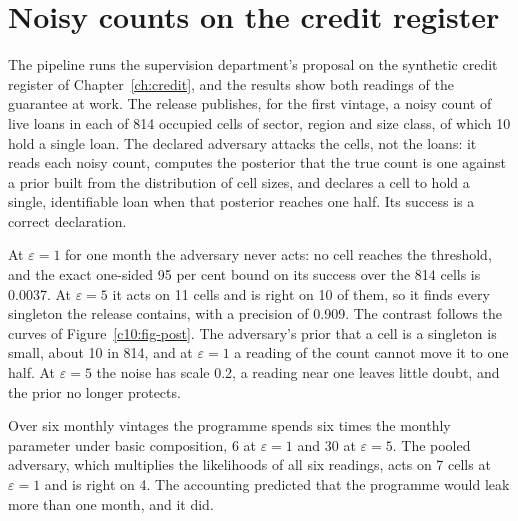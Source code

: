 \section{Noisy counts on the credit register}\label{c10:sec-counts}

The pipeline runs the supervision department's proposal on the synthetic credit
register of Chapter~\ref{ch:credit}, and the results show both readings of the
guarantee at work. The release publishes, for the first vintage, a noisy count of
live loans in each of 814 occupied cells of sector, region and size class, of which
10 hold a single loan.
The declared adversary attacks the cells, not the loans: it reads each noisy
count, computes the posterior that the true count is one against a prior built
from the distribution of cell sizes, and declares a cell to hold a single,
identifiable loan when that posterior reaches one half. Its success is a correct
declaration.

At $\varepsilon = 1$ for one month the adversary never acts: no cell reaches the
threshold, and the exact one-sided 95 per cent bound on its success over the 814
cells is 0.0037. At $\varepsilon = 5$ it acts on 11 cells and is right on 10 of
them, so it finds every singleton the release contains, with a precision of 0.909.
The contrast follows the curves of Figure~\ref{c10:fig-post}. The adversary's
prior that a cell is a singleton is small, about 10 in 814, and at
$\varepsilon = 1$ a reading of the count cannot move it to one half. At
$\varepsilon = 5$ the noise has scale 0.2, a reading near one leaves little doubt,
and the prior no longer protects.

Over six monthly vintages the programme spends six times the monthly parameter
under basic composition, 6 at $\varepsilon = 1$ and 30 at $\varepsilon = 5$. The
pooled adversary, which multiplies the likelihoods of all six readings, acts on 7
cells at $\varepsilon = 1$ and is right on 4.
The accounting predicted that the programme would leak more than one month, and
it did.

